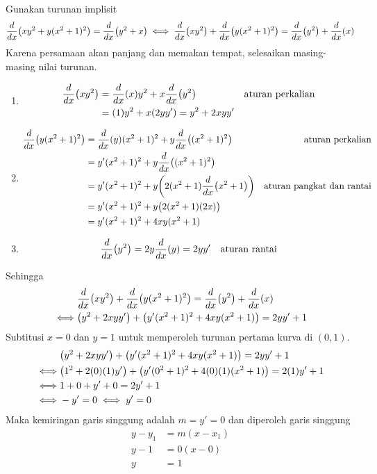 \begin{enumerate}[leftmargin=*, label={\arabic*}.]
\begin{enumerate}[label={\alph*}.]
    Gunakan turunan implisit
    \begin{align*}
        \drv{x}{xy^{2}+y(x^{2}+1)^{2}} = \drv{x}{y^{2}+x} \iff 
        \drv{x}{xy^{2}} + \drv{x}{y(x^{2}+1)^{2}} = \drv{x}{y^{2}} + \drv{x}{x}
    \end{align*}
    Karena persamaan akan panjang dan memakan tempat, selesaikan masing-masing nilai 
    turunan.
        \begin{enumerate}[label={\arabic*})]
        \item 
        \begin{align*}
            \drv{x}{xy^{2}} 
            &= \drv{x}{x}y^{2}+x\drv{x}{y^{2}}
            &\text{aturan perkalian}\\
            &= (1)y^{2} + x(2yy') = y^{2} + 2xyy'
        \end{align*}
        \item 
        \begin{align*}
            \drv{x}{y(x^{2}+1)^{2}} 
            &= \drv{x}{y}(x^{2}+1)^{2}+y\drv{x}{(x^{2}+1)^{2}}
            &\text{aturan perkalian}\\
            &= y'(x^{2}+1)^{2} + y\drv{x}{(x^{2}+1)^{2}}\\
            &=y'(x^{2}+1)^{2} + y\brk*{2(x^{2}+1)\drv{x}{x^{2}+1}}
            &\text{aturan pangkat dan rantai}\\
            &=y'(x^{2}+1)^{2} + y\brk*{2(x^{2}+1)(2x)}\\
            &=y'(x^{2}+1)^{2} + 4xy(x^{2}+1)
        \end{align*}
        \item 
        \[
            \drv{x}{y^{2}} = 2y\drv{x}{y} = 2yy' \quad \text{aturan rantai}
        \]
        \end{enumerate}
    Sehingga 
    \begin{align*}
        &\drv{x}{xy^{2}} + \drv{x}{y(x^{2}+1)^{2}} = \drv{x}{y^{2}} + \drv{x}{x} \\
        \iff &\brk*{y^{2} + 2xyy'} + \brk*{y'(x^{2}+1)^{2} 
        + 4xy(x^{2}+1)}= 2yy' + 1\\
    \end{align*}
    Subtitusi $x = 0$ dan $y=1$ untuk memperoleh turunan pertama kurva di $(0,1)$.
    \begin{align*}
        &\brk*{y^{2} + 2xyy'} + \brk*{y'(x^{2}+1)^{2} 
        + 4xy(x^{2}+1)}= 2yy' + 1\\
        \iff &\brk*{1^{2} + 2(0)(1)y'} + \brk*{y'(0^{2}+1)^{2} 
        + 4(0)(1)(x^{2}+1)}= 2(1)
        y' + 1\\
        \iff &1+0+y'+0 = 2y'+1\\
        \iff &-y' = 0 \iff y' = 0
    \end{align*}
    Maka kemiringan garis singgung adalah $m = y' = 0$ dan diperoleh garis singgung
    \begin{align*}
        y-y_1 &= m(x-x_1)\\
        y-1 &= 0(x-0)\\
        y &= 1
    \end{align*}


\end{enumerate}
\end{enumerate}
